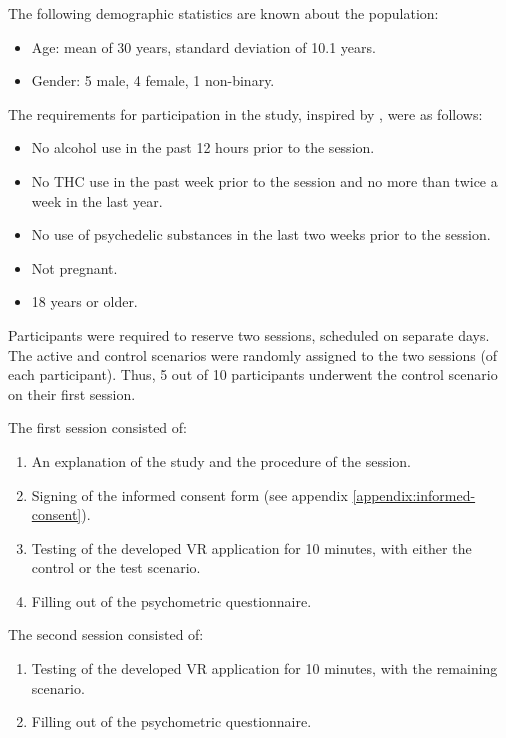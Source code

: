 The following demographic statistics are known about the population:
\begin{itemize}
    \setlength{\itemsep}{0pt}
    \setlength{\parskip}{0pt}
    \item Age: mean of 30 years, standard deviation of 10.1 years.
    \item Gender: 5 male, 4 female, 1 non-binary.
\end{itemize}

The requirements for participation in the study, inspired by \textcite{bartossek2021altered}, were as follows:
\begin{itemize}
    \setlength{\itemsep}{0pt}
    \setlength{\parskip}{0pt}
    \item No alcohol use in the past 12 hours prior to the session.
    \item No \acs{THC} use in the past week prior to the session and no more than twice a week in the last year.
    \item No use of psychedelic substances in the last two weeks prior to the session.
    \item Not pregnant.
    \item 18 years or older.
\end{itemize}

Participants were required to reserve two sessions, scheduled on separate days. The active and control scenarios were randomly assigned to the two sessions (of each participant). Thus, 5 out of 10 participants underwent the control scenario on their first session.

The first session consisted of:
\begin{enumerate}
    \setlength{\itemsep}{0pt}
    \setlength{\parskip}{0pt}
    \item An explanation of the study and the procedure of the session.
    \item Signing of the informed consent form (see appendix \ref{appendix:informed-consent}).
    \item Testing of the developed VR application for 10 minutes, with either the control or the test scenario.
    \item Filling out of the psychometric questionnaire.
\end{enumerate}

The second session consisted of:
\begin{enumerate}
    \setlength{\itemsep}{0pt}
    \setlength{\parskip}{0pt}
    \item Testing of the developed VR application for 10 minutes, with the remaining scenario.
    \item Filling out of the psychometric questionnaire.
\end{enumerate}

